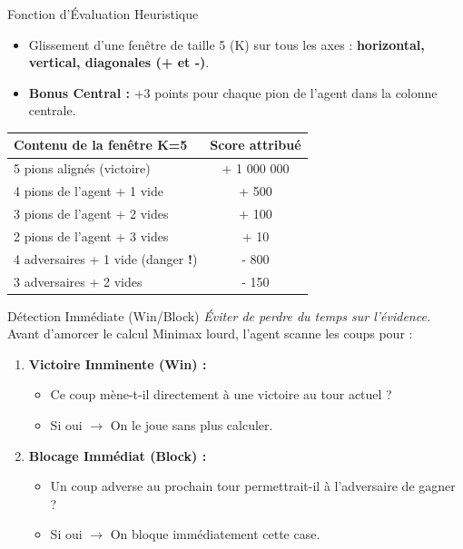 \documentclass{beamer}
\begin{document}
\begin{frame}{Fonction d'Évaluation Heuristique}
    \begin{itemize}
        \item Glissement d'une fenêtre de taille 5 (K) sur tous les axes : \textbf{horizontal, vertical, diagonales (+ et -)}.
        \item \textbf{Bonus Central :} +3 points pour chaque pion de l'agent dans la colonne centrale.
    \end{itemize}
    \vspace{0.2cm}
    \begin{table}[]
        \centering
        \renewcommand{\arraystretch}{1.3}
        \begin{tabular}{|l|c|}
            \hline
            \textbf{Contenu de la fenêtre K=5} & \textbf{Score attribué} \\ \hline
            5 pions alignés (victoire) & + 1 000 000 \\ \hline
            4 pions de l'agent + 1 vide & + 500 \\ \hline
            3 pions de l'agent + 2 vides & + 100 \\ \hline
            2 pions de l'agent + 3 vides & + 10 \\ \hline
            4 adversaires + 1 vide (danger \textbf{!}) & - 800 \\ \hline
            3 adversaires + 2 vides & - 150 \\ \hline
        \end{tabular}
    \end{table}
\end{frame}

\begin{frame}{Détection Immédiate (Win/Block)}
    \textit{Éviter de perdre du temps sur l'évidence.} \\
    Avant d'amorcer le calcul Minimax lourd, l'agent scanne les coups pour :
    \vspace{0.4cm}
    \begin{enumerate}
        \item \textbf{Victoire Imminente (Win) :}
        \begin{itemize}
            \item Ce coup mène-t-il directement à une victoire au tour actuel ?
            \item Si oui $\rightarrow$ On le joue sans plus calculer.
        \end{itemize}
        \vspace{0.3cm}
        \item \textbf{Blocage Immédiat (Block) :}
        \begin{itemize}
            \item Un coup adverse au prochain tour permettrait-il à l'adversaire de gagner ?
            \item Si oui $\rightarrow$ On bloque immédiatement cette case.
        \end{itemize}
    \end{enumerate}
\end{frame}
\end{document}
